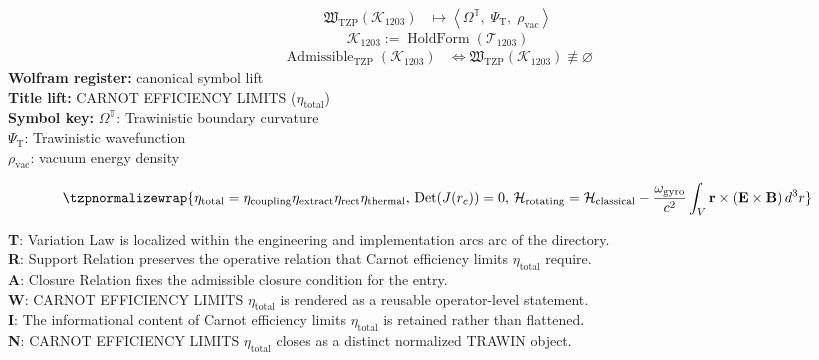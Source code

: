 \noindent
\begin{minipage}[t]{0.48\linewidth}
\begingroup
\small
\[
\begin{aligned}
\mathfrak{W}_{\mathrm{TZP}}\!\left(\mathcal{K}_{1203}\right)
&\longmapsto
\left\langle \Omega^{\mathbb{T}},\; \Psi_{\mathrm{T}},\; \rho_{\mathrm{vac}} \right\rangle
\end{aligned}
\]
\[
\mathcal{K}_{1203}
:=
\operatorname{HoldForm}\!\left(\mathcal{T}_{1203}\right)
\]
\[
\begin{aligned}
\operatorname{Admissible}_{\mathrm{TZP}}\!\left(\mathcal{K}_{1203}\right)
&\Longleftrightarrow
\mathfrak{W}_{\mathrm{TZP}}\!\left(\mathcal{K}_{1203}\right)\not\equiv\varnothing
\end{aligned}
\]
\textbf{Wolfram register:} canonical symbol lift\\
\textbf{Title lift:} CARNOT EFFICIENCY LIMITS (\(\eta_{\mathrm{total}}\))\\
\textbf{Symbol key:} \(\Omega^{\mathbb{T}}\): Trawinistic boundary curvature\\ \(\Psi_{\mathrm{T}}\): Trawinistic wavefunction\\ \(\rho_{\mathrm{vac}}\): vacuum energy density
\par
\endgroup
\end{minipage}\hfill
\begin{minipage}[t]{0.48\linewidth}
\[
\tzpnormalizewrap{\eta_{\mathrm{total}}=\eta_{\mathrm{coupling}}\eta_{\mathrm{extract}}\eta_{\mathrm{rect}}\eta_{\mathrm{thermal}},\,\operatorname{Det}(J(r_c))=0,\,\mathcal{H}_{\mathrm{rotating}}=\mathcal{H}_{\mathrm{classical}}-\frac{\omega_{\mathrm{gyro}}}{c^2}\int_V\mathbf{r}\times(\mathbf{E}\times\mathbf{B})\,d^3r}
\]

\small
\textbf{T}: Variation Law is localized within the engineering and implementation arcs arc of the directory.\\
\textbf{R}: Support Relation preserves the operative relation that Carnot efficiency limits \(\eta_{\mathrm{total}}\) require.\\
\textbf{A}: Closure Relation fixes the admissible closure condition for the entry.\\
\textbf{W}: CARNOT EFFICIENCY LIMITS \(\eta_{\mathrm{total}}\) is rendered as a reusable operator-level statement.\\
\textbf{I}: The informational content of Carnot efficiency limits \(\eta_{\mathrm{total}}\) is retained rather than flattened.\\
\textbf{N}: CARNOT EFFICIENCY LIMITS \(\eta_{\mathrm{total}}\) closes as a distinct normalized TRAWIN object.
\normalsize
\end{minipage}

